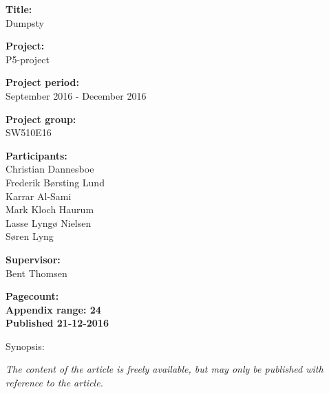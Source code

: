 \begin{minipage}[t]{0.48\textwidth}
\textbf{Title:} \\[5pt]\bigskip\hspace{2ex}
Dumpsty

\textbf{Project:} \\[5pt]\bigskip\hspace{2ex}
P5-project

\textbf{Project period:} \\[5pt]\bigskip\hspace{2ex}
September 2016 - December 2016

\textbf{Project group:} \\[5pt]\bigskip\hspace{2ex}
SW510E16	

\textbf{Participants:} \\[5pt]\hspace*{2ex}
Christian Dannesboe \\\hspace*{2ex}
Frederik Børsting Lund \\\hspace*{2ex}
Karrar Al-Sami \\\hspace*{2ex}
Mark Kloch Haurum \\\hspace*{2ex}
Lasse Lyngø Nielsen \\\hspace*{2ex}
Søren Lyng \\\hspace*{2ex}

\textbf{Supervisor:} \\[5pt]\hspace*{2ex}
Bent Thomsen

\vspace*{1cm}


\textbf{Pagecount: \pageref{LastPage}} \\
\textbf{Appendix range: 24} \\ 
\textbf{Published 21-12-2016}

\end{minipage}
\hfill
\begin{minipage}[t]{0.483\textwidth}
Synopsis: \\[5pt]
\fbox{\parbox{7cm}{\bigskip\bigskip}}
\end{minipage}

\vfill

{\footnotesize\itshape The content of the article is freely available, but may only be published with reference to the article.}

